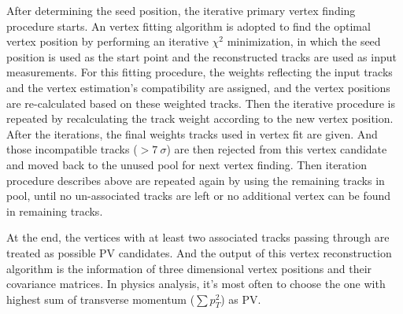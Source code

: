 After determining the seed position, the iterative primary vertex finding procedure starts.
An vertex fitting algorithm is adopted to find the optimal vertex position by performing an iterative $\chi^{2}$ minimization,
in which the seed position is used as the start point and the reconstructed tracks are used as input measurements.
For this fitting procedure, the weights reflecting the input tracks and the vertex estimation's compatibility are assigned, 
and the vertex positions are re-calculated based on these weighted tracks.
Then the iterative procedure is repeated by recalculating the track weight according to the new vertex position.
After the iterations, the final weights tracks used in vertex fit are given. 
And those incompatible tracks ($> 7~\sigma$) are then rejected from this vertex candidate and moved back to the unused pool for next vertex finding.
Then iteration procedure describes above are repeated again by using the remaining tracks in pool, until no un-associated tracks are left or no additional vertex can be found in remaining tracks.

At the end, the vertices with at least two associated tracks passing through are treated as possible PV candidates.
And the output of this vertex reconstruction algorithm is the information of three dimensional vertex positions and their covariance matrices.
In physics analysis, it's most often to choose the one with highest sum of transverse momentum ($\sum{p_{T}^{2}}$) as PV.
